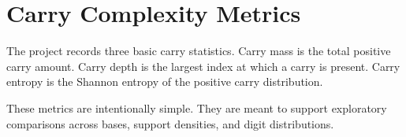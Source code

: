 \section{Carry Complexity Metrics}

The project records three basic carry statistics. Carry mass is the total
positive carry amount. Carry depth is the largest index at which a carry is
present. Carry entropy is the Shannon entropy of the positive carry
distribution.

These metrics are intentionally simple. They are meant to support exploratory
comparisons across bases, support densities, and digit distributions.
